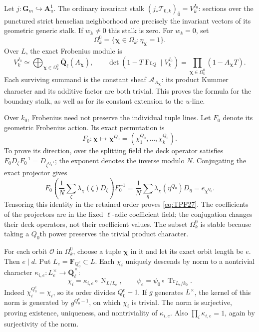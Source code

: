 Let \(j:\mathbf G_m\hookrightarrow\mathbf A^1_u\).
The ordinary invariant stalk
\((j_*\mathcal T_{0,k})_{\bar0}=V_k^{I_0}\):
sections over the punctured strict henselian
neighborhood are precisely the invariant vectors
of its geometric generic stalk. If \(w_k\ne0\)
this stalk is zero. For \(w_k=0\), set
\[
 \Omega_k^0=\{\boldsymbol\chi\in\Omega_k:
                         \eta_{\boldsymbol\chi}=1\}.
 \tag{TPF.25}\label{eq:TPF25}
\]
Over \(L\), the exact Frobenius module is
\[
 V_k^{I_0}\simeq
       \bigoplus_{\boldsymbol\chi\in\Omega_k^0}
                    \overline{\mathbf Q}_\ell(A_{\boldsymbol\chi}),
 \qquad
 \det(1-T\operatorname{Fr}_Q\mid V_k^{I_0})
       =\prod_{\boldsymbol\chi\in\Omega_k^0}
                              (1-A_{\boldsymbol\chi}T).
 \tag{TPF.26}\label{eq:TPF26}
\]
Each surviving summand is the constant sheaf
\(\mathcal A_{A_{\boldsymbol\chi}}\): its product
Kummer character and its additive factor are
both trivial. This proves the formula for the
boundary stalk, as well as for its constant
extension to the \(u\)-line.

Over \(k_0\), Frobenius need not preserve the
individual tuple lines. Let \(F_0\) denote its
geometric Frobenius action. Its exact permutation
is
\[
 F_0:\boldsymbol\chi\longmapsto
       \boldsymbol\chi^{Q_0}
              =(\chi_1^{Q_0},\ldots,\chi_k^{Q_0}).
 \tag{TPF.27}\label{eq:TPF27}
\]
To prove its direction, over the splitting field
the deck operator satisfies
\(F_0D_\zeta F_0^{-1}=D_{\zeta^{Q_0^{-1}}}\);
the exponent denotes the inverse modulo \(N\).
Conjugating the exact projector gives
\[
 F_0\left(\frac1N\sum_\zeta
       \lambda_\chi(\zeta)D_\zeta\right)F_0^{-1}
  =\frac1N\sum_\eta
       \lambda_\chi(\eta^{Q_0})D_\eta
  =e_{\chi^{Q_0}} .
 \tag{TPF.28}\label{eq:TPF28}
\]
Tensoring this identity in the retained order proves
\eqref{eq:TPF27}. The coefficients of the projectors
are in the fixed \(\ell\)-adic coefficient field;
the conjugation changes their deck operators, not
their coefficient values. The subset \(\Omega_k^0\)
is stable because taking a \(Q_0\)th power preserves
the trivial product character.

For each orbit \(\mathcal O\) in \(\Omega_k^0\),
choose a tuple \(\boldsymbol\chi\) in it and let its
exact orbit length be \(e\). Then \(e\mid d\).
Put \(L_e=\mathbf F_{Q_0^e}\subset L\).
Each \(\chi_i\) uniquely descends by norm to a
nontrivial character
\(\kappa_{i,e}:L_e^\times\to
\overline{\mathbf Q}_\ell^\times\):
\[
 \chi_i=\kappa_{i,e}\circ\operatorname N_{L/L_e},
 \qquad
 \psi_e=\psi_0\circ\operatorname{Tr}_{L_e/k_0}.
 \tag{TPF.29}\label{eq:TPF29}
\]
Indeed \(\chi_i^{Q_0^e}=\chi_i\), so its order
divides \(Q_0^e-1\). If \(g\) generates \(L^\times\),
the kernel of this norm is generated by
\(g^{Q_0^e-1}\), on which \(\chi_i\) is trivial.
The norm is surjective, proving existence,
uniqueness, and nontriviality of \(\kappa_{i,e}\).
Also \(\prod_i\kappa_{i,e}=1\), again by surjectivity
of the norm.

